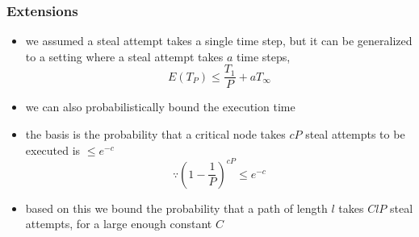 \documentclass[12pt,dvipdfmx]{beamer}
\begin{document}

\begin{frame}
\frametitle{Extensions}
\begin{itemize}
\item we assumed a steal attempt takes a single time step, 
  but it can be generalized to a setting where 
  a steal attempt takes $a$ time steps,
\[ E(T_P) \leq \frac{T_1}{P} + aT_\infty \]

\item we can also probabilistically bound the execution time
\item the basis is the probability that a critical node 
  takes $cP$ steal attempts to be executed is $\leq e^{-c}$
\begin{equation*}
\because \left(1 - \frac{1}{P}\right)^{cP} \leq e^{-c}
\end{equation*}

\item based on this we bound the probability that
  a path of length $l$ takes $ClP$ steal
  attempts, for a large enough constant $C$

\end{itemize}

\end{frame}


\end{document}
